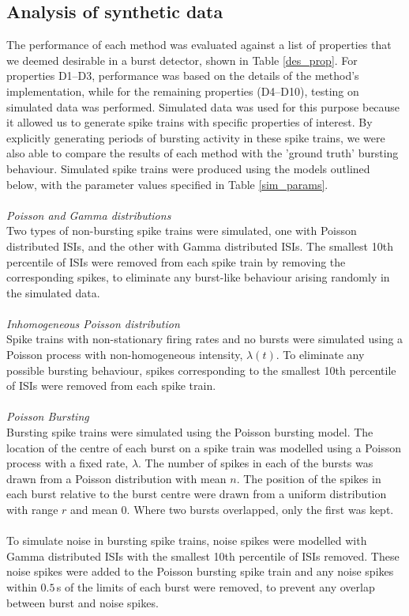 \documentclass[12pt, titlepage]{article}
\begin{document}
	\subsection*{Analysis of synthetic data}
	The performance of each method was evaluated against a list of properties that we deemed desirable in a burst detector, shown in Table \ref{des_prop}. For properties D1--D3, performance was based on the details of the method's implementation, while for the remaining properties (D4--D10), testing on simulated data was performed. Simulated data was used for this purpose because it allowed us to generate spike trains with specific properties of interest. By explicitly generating periods of bursting activity in these spike trains, we were also able to compare the results of each method with the 'ground truth' bursting behaviour. Simulated spike trains were produced using the models outlined below, with the parameter values specified in Table \ref{sim_params}.
	\\\\ 	\textit{Poisson and Gamma distributions}
	\\Two types of non-bursting spike trains were simulated, one with Poisson distributed ISIs, and the other with Gamma distributed ISIs. The smallest 10th percentile of ISIs were removed from each spike train by removing the corresponding spikes, to eliminate any burst-like behaviour arising randomly in the simulated data.
	\\ \\  \textit{Inhomogeneous Poisson distribution}
	\\ Spike trains with non-stationary firing rates and no bursts were simulated using a Poisson process with non-homogeneous intensity, $\lambda(t)$. To eliminate any possible bursting behaviour, spikes corresponding to the smallest 10th percentile of ISIs were removed from each spike train.
	\\ \\  \textit{Poisson Bursting}
	\\ Bursting spike trains were simulated using the Poisson bursting model. The location of the centre of each burst on a spike train was modelled using a Poisson process with a fixed rate, $\lambda$. The number of spikes in each of the bursts was drawn from a Poisson distribution with mean $n$. The position of the spikes in each burst relative to the burst centre were drawn from a uniform distribution with range $r$ and mean 0. Where two bursts overlapped, only the first was kept. 
	\\ \\ To simulate noise in bursting spike trains, noise spikes were modelled with Gamma distributed ISIs with the smallest 10th percentile of ISIs removed. These noise spikes were added to the Poisson bursting spike train and any noise spikes within $0.5 \,$s of the limits of each burst were removed, to prevent any overlap between burst and noise spikes.
\end{document}
